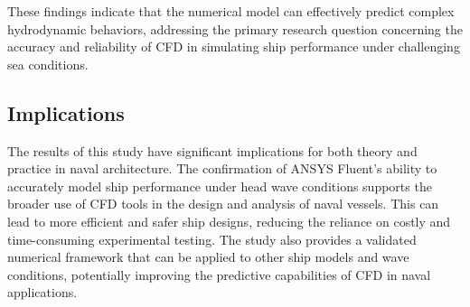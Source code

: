 \documentclass[12pt]{article} %
\begin{document}
These findings indicate that the numerical model can effectively predict complex hydrodynamic behaviors, addressing the primary research question 
concerning the accuracy and reliability of CFD in simulating ship performance under challenging sea conditions.


\subsection{Implications}
The results of this study have significant implications for both theory and practice in naval 
architecture. The confirmation of ANSYS Fluent’s ability to accurately model ship performance 
under head wave conditions supports the broader use of CFD tools in the design and analysis of 
naval vessels. This can lead to more efficient and safer ship designs, reducing the reliance on 
costly and time-consuming experimental testing. The study also provides a validated numerical 
framework that can be applied to other ship models and wave conditions, potentially improving 
the predictive capabilities of CFD in naval applications.
\end{document}
